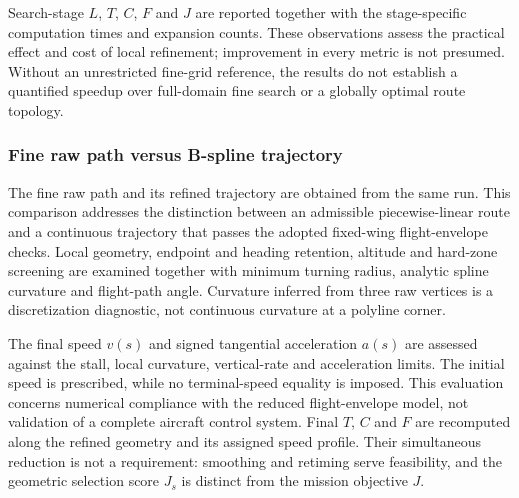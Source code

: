Search-stage $L$, $T$, $C$, $F$ and $J$ are reported together with the
stage-specific computation times and expansion counts. These observations
assess the practical effect and cost of local refinement; improvement in
every metric is not presumed. Without an unrestricted fine-grid reference,
the results do not establish a quantified speedup over full-domain fine
search or a globally optimal route topology.


\subsubsection{Fine raw path versus B-spline trajectory}
\label{sec:refinement_comparison}

The fine raw path and its refined trajectory are obtained from the same
run. This comparison addresses the distinction between an admissible
piecewise-linear route and a continuous trajectory that passes the adopted
fixed-wing flight-envelope checks. Local geometry, endpoint and heading
retention, altitude and hard-zone screening are examined together with
minimum turning radius, analytic spline curvature and flight-path angle.
Curvature inferred from three raw vertices is a discretization diagnostic,
not continuous curvature at a polyline corner.

The final speed $v(s)$ and signed tangential acceleration $a(s)$ are
assessed against the stall, local curvature, vertical-rate and acceleration
limits. The initial speed is prescribed, while no terminal-speed equality
is imposed. This evaluation concerns numerical compliance with the reduced
flight-envelope model, not validation of a complete aircraft control system.
Final $T$, $C$ and $F$ are recomputed along the refined geometry and its
assigned speed profile. Their simultaneous reduction is not a requirement:
smoothing and retiming serve feasibility, and the geometric selection
score $J_s$ is distinct from the mission objective $J$.


